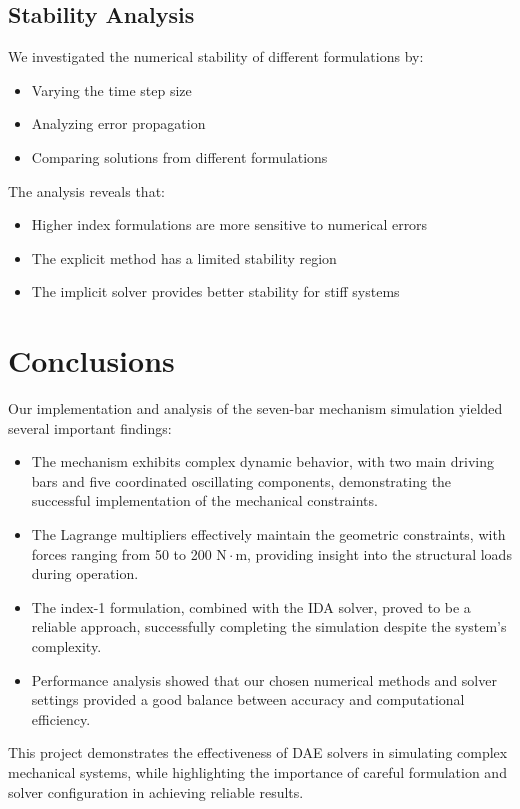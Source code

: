 \documentclass{article}
\begin{document}
\subsection{Stability Analysis}
\indent

We investigated the numerical stability of different formulations by:
\begin{itemize}
    \item Varying the time step size
    \item Analyzing error propagation
    \item Comparing solutions from different formulations
\end{itemize}

The analysis reveals that:
\begin{itemize}
    \item Higher index formulations are more sensitive to numerical errors
    \item The explicit method has a limited stability region
    \item The implicit solver provides better stability for stiff systems
\end{itemize}

\section*{Conclusions}
\indent

Our implementation and analysis of the seven-bar mechanism simulation yielded several important findings:

\begin{itemize}
    \item The mechanism exhibits complex dynamic behavior, with two main driving bars and five coordinated oscillating components, demonstrating the successful implementation of the mechanical constraints.
    
    \item The Lagrange multipliers effectively maintain the geometric constraints, with forces ranging from 50 to 200 $\mathrm{N}\cdot\mathrm{m}$, providing insight into the structural loads during operation.
    
    \item The index-1 formulation, combined with the IDA solver, proved to be a reliable approach, successfully completing the simulation despite the system's complexity.
    
    \item Performance analysis showed that our chosen numerical methods and solver settings provided a good balance between accuracy and computational efficiency.
\end{itemize}

This project demonstrates the effectiveness of DAE solvers in simulating complex mechanical systems, while highlighting the importance of careful formulation and solver configuration in achieving reliable results.
\end{document}
